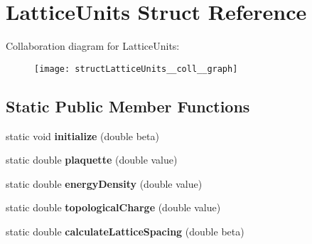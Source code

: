 \hypertarget{structLatticeUnits}{}\section{Lattice\+Units Struct Reference}
\label{structLatticeUnits}


Collaboration diagram for Lattice\+Units\+:
\nopagebreak
\begin{figure}[H]
\begin{center}
\leavevmode
\texttt{[image: structLatticeUnits\_\_coll\_\_graph]}
\end{center}
\end{figure}
\subsection*{Static Public Member Functions}
\begin{DoxyCompactItemize}
\item 
static void {\bfseries initialize} (double beta)\hypertarget{structLatticeUnits_aab79d194c5e0fe83a2a82699cba937d7}{}\label{structLatticeUnits_aab79d194c5e0fe83a2a82699cba937d7}

\item 
static double {\bfseries plaquette} (double value)\hypertarget{structLatticeUnits_a94885e1b395f03c5f5ba782c858c7bff}{}\label{structLatticeUnits_a94885e1b395f03c5f5ba782c858c7bff}

\item 
static double {\bfseries energy\+Density} (double value)\hypertarget{structLatticeUnits_a4502a78cb4108e384237bf712e63cad4}{}\label{structLatticeUnits_a4502a78cb4108e384237bf712e63cad4}

\item 
static double {\bfseries topological\+Charge} (double value)\hypertarget{structLatticeUnits_a3ac89830a331c395ce5499e22561ff33}{}\label{structLatticeUnits_a3ac89830a331c395ce5499e22561ff33}

\item 
static double {\bfseries calculate\+Lattice\+Spacing} (double beta)\hypertarget{structLatticeUnits_a91915347f75f916de879ee43b1f46af3}{}\label{structLatticeUnits_a91915347f75f916de879ee43b1f46af3}

\end{DoxyCompactItemize}
